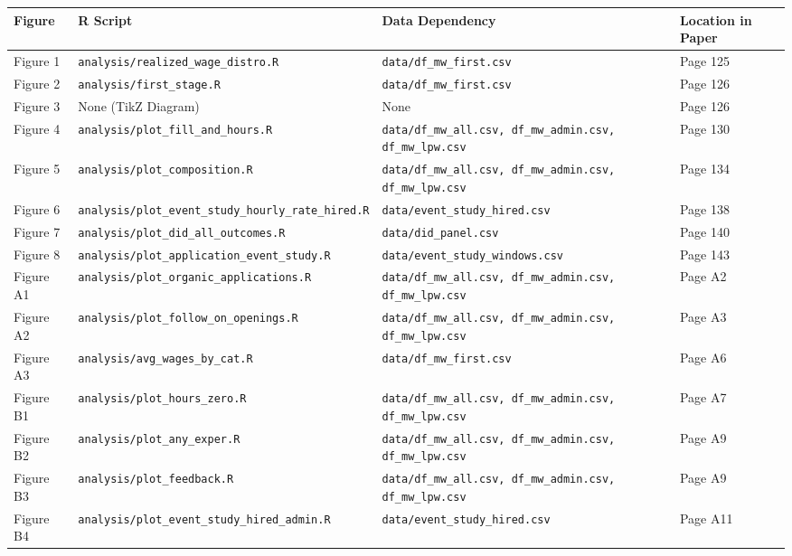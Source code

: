 \documentclass[10pt]{article}
\newenvironment{eightpt}{\begingroup\fontsize{8}{13}\selectfont}{\endgroup}
\begin{document}
\begin{eightpt}
\begin{tabularx}{\textwidth}{@{}p{}p{}p{}>{\centering\arraybackslash}p{}@{}}
\toprule
Figure & R Script & Data Dependency & Location in Paper \\
\midrule
Figure 1 & \texttt{analysis/realized\_wage\_distro.R} & \texttt{data/df\_mw\_first.csv} & Page 125 \\
Figure 2 & \texttt{analysis/first\_stage.R} & \texttt{data/df\_mw\_first.csv} & Page 126 \\
Figure 3 & None (TikZ Diagram) & None & Page 126 \\
Figure 4 & \texttt{analysis/plot\_fill\_and\_hours.R} & \texttt{data/df\_mw\_all.csv, df\_mw\_admin.csv, df\_mw\_lpw.csv} & Page 130 \\
Figure 5 & \texttt{analysis/plot\_composition.R} & \texttt{data/df\_mw\_all.csv, df\_mw\_admin.csv, df\_mw\_lpw.csv} & Page 134 \\
Figure 6 & \texttt{analysis/plot\_event\_study\_hourly\_rate\_hired.R} & \texttt{data/event\_study\_hired.csv} & Page 138 \\
Figure 7 & \texttt{analysis/plot\_did\_all\_outcomes.R} & \texttt{data/did\_panel.csv} & Page 140 \\
Figure 8 & \texttt{analysis/plot\_application\_event\_study.R} & \texttt{data/event\_study\_windows.csv} & Page 143 \\
Figure A1 & \texttt{analysis/plot\_organic\_applications.R} & \texttt{data/df\_mw\_all.csv, df\_mw\_admin.csv, df\_mw\_lpw.csv} & Page A2 \\
Figure A2 & \texttt{analysis/plot\_follow\_on\_openings.R} & \texttt{data/df\_mw\_all.csv, df\_mw\_admin.csv, df\_mw\_lpw.csv} & Page A3 \\
Figure A3 & \texttt{analysis/avg\_wages\_by\_cat.R} & \texttt{data/df\_mw\_first.csv} & Page A6 \\
Figure B1 & \texttt{analysis/plot\_hours\_zero.R} & \texttt{data/df\_mw\_all.csv, df\_mw\_admin.csv, df\_mw\_lpw.csv} & Page A7 \\
Figure B2 & \texttt{analysis/plot\_any\_exper.R} & \texttt{data/df\_mw\_all.csv, df\_mw\_admin.csv, df\_mw\_lpw.csv} & Page A9 \\
Figure B3 & \texttt{analysis/plot\_feedback.R} & \texttt{data/df\_mw\_all.csv, df\_mw\_admin.csv, df\_mw\_lpw.csv} & Page A9 \\
Figure B4 & \texttt{analysis/plot\_event\_study\_hired\_admin.R} & \texttt{data/event\_study\_hired.csv} & Page A11 \\
\bottomrule
\end{tabularx}
\end{eightpt}
\end{document}
